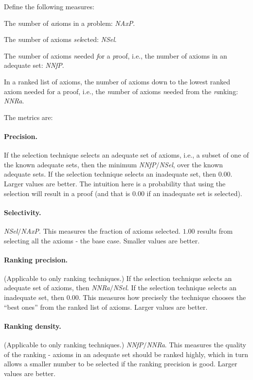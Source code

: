 \documentclass[EPiC]{easychair}
\newenvironment{packed_itemize}{
\vspace*{-0.5em}
\begin{itemize}
  \setlength{\partopsep}{0pt}
  \setlength{\itemsep}{1pt}
  \setlength{\parskip}{0pt}
  \setlength{\parsep}{0pt}
}{\end{itemize}}
\begin{document}
Define the following measures:
\begin{packed_itemize}
\item The \emph{n}umber of \emph{ax}ioms in a \emph{p}roblem: \emph{NAxP}.
\item The \emph{n}umber of axioms \emph{sel}ected: \emph{NSel}.
\item The \emph{n}umber of axioms \emph{n}eeded \emph{f}or a \emph{p}roof, 
      i.e., the number of axioms in an adequate set: \emph{NNfP}.
\item In a ranked list of axioms, the number of axioms down to the lowest ranked
      axiom needed for a proof, i.e., the \emph{n}umber of axioms
      \emph{n}eeded from the \emph{ra}nking: \emph{NNRa}.
\end{packed_itemize}

The metrics are:

\paragraph{Precision.}
If the selection technique selects an adequate set of axioms, i.e., a subset
of one of the known adequate sets, then the minimum \emph{NNfP}$/$\emph{NSel},
over the known adequate sets.
If the selection technique selects an inadequate set, then $0.00$.
Larger values are better.
The intuition here is a probability that using the selection will result
in a proof (and that is $0.00$ if an inadequate set is selected).

\paragraph{Selectivity.}
\emph{NSel}$/$\emph{NAxP}.
This measures the fraction of axioms selected.
$1.00$ results from selecting all the axioms - the base case.
Smaller values are better.

\paragraph{Ranking precision.}
(Applicable to only ranking techniques.)
If the selection technique selects an adequate set of axioms, then
\emph{NNRa}$/$\emph{NSel}.
If the selection technique selects an inadequate set, then $0.00$.
This measures how precisely the technique chooses the ``best ones'' from
the ranked list of axioms.
Larger values are better.

\paragraph{Ranking density.}
(Applicable to only ranking techniques.)
\emph{NNfP}$/$\emph{NNRa}.
This measures the quality of the ranking - axioms in an adequate set should
be ranked highly, which in turn allows a smaller number to be selected if
the ranking precision is good.
Larger values are better.
\end{document}
